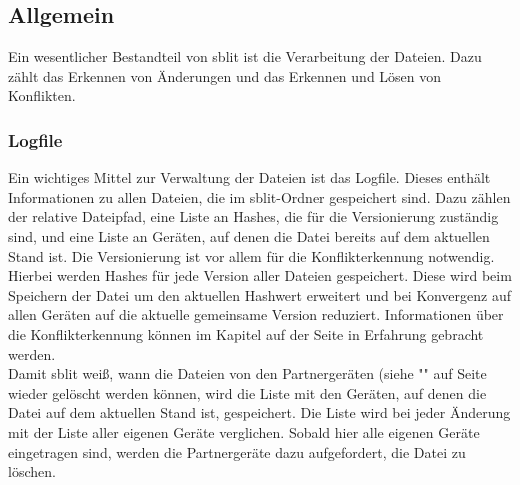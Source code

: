 \subsection{Allgemein}
Ein wesentlicher Bestandteil von sblit ist die Verarbeitung der Dateien. Dazu zählt das Erkennen von Änderungen und das Erkennen und Lösen von Konflikten.
\subsubsection{Logfile} \label{Logfile}
Ein wichtiges Mittel zur Verwaltung der Dateien ist das Logfile. Dieses enthält Informationen zu allen Dateien, die im sblit-Ordner gespeichert sind. Dazu zählen der relative Dateipfad, eine Liste an Hashes, die für die Versionierung zuständig sind, und eine Liste an Geräten, auf denen die Datei bereits auf dem aktuellen Stand ist. Die Versionierung ist vor allem für die Konflikterkennung notwendig. Hierbei werden Hashes für jede Version aller Dateien gespeichert. Diese wird beim Speichern der Datei um den aktuellen Hashwert erweitert und bei Konvergenz auf allen Geräten auf die aktuelle gemeinsame Version reduziert. Informationen über die Konflikterkennung können im Kapitel  auf der Seite \pageref{Konflikterkennung} in Erfahrung gebracht werden. \\
Damit sblit weiß, wann die Dateien von den Partnergeräten (siehe "" auf Seite \pageref{Partergerät} wieder gelöscht werden können, wird die Liste mit den Geräten, auf denen die Datei auf dem aktuellen Stand ist, gespeichert. Die Liste wird bei jeder Änderung mit der Liste aller eigenen Geräte verglichen. Sobald hier alle eigenen Geräte eingetragen sind, werden die Partnergeräte dazu aufgefordert, die Datei zu löschen. 

